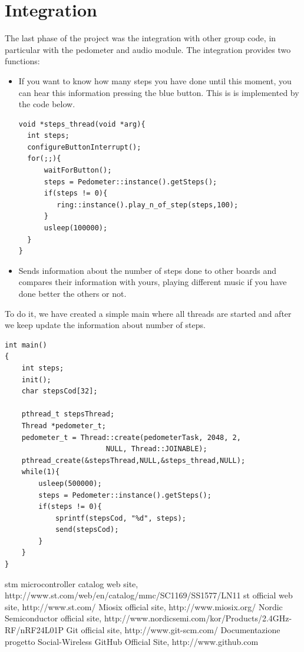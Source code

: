 \documentclass[11pt,a4paper,oneside]{article}
\begin{document}
\section{Integration}
The last phase of the project was the integration with other group code, in particular with the pedometer and audio module.
The integration provides two functions:
\begin{itemize}
\item If you want to know how many steps you have done until this moment, you can hear this information pressing the blue button. This is is implemented by the code below.
\lstset{numbers=left,numberstyle=\tiny}
\begin{lstlisting}[frame=single]
void *steps_thread(void *arg){
  int steps;
  configureButtonInterrupt();
  for(;;){
      waitForButton();
      steps = Pedometer::instance().getSteps();
      if(steps != 0){
         ring::instance().play_n_of_step(steps,100);
      }
      usleep(100000);      
  }
}
\end{lstlisting}
\item Sends information about the number of steps done to other boards and compares their information with yours, playing different music if you have done better the others or not.
\end{itemize} 
To do it, we have created a simple main where all threads are started and after we keep update the information about number of steps.
\lstset{numbers=left,numberstyle=\tiny}
\begin{lstlisting}[frame=single]
int main()
{
    int steps;
    init();
    char stepsCod[32];
		
    pthread_t stepsThread;
    Thread *pedometer_t;
    pedometer_t = Thread::create(pedometerTask, 2048, 2, 
                        NULL, Thread::JOINABLE);
    pthread_create(&stepsThread,NULL,&steps_thread,NULL);
    while(1){
        usleep(500000);
        steps = Pedometer::instance().getSteps();
        if(steps != 0){
            sprintf(stepsCod, "%d", steps);
            send(stepsCod);
        }
    }
}
\end{lstlisting}

\newpage
\begin{thebibliography}{99}

	 stm microcontroller catalog web site,\\http://www.st.com/web/en/catalog/mmc/SC1169/SS1577/LN11
	 st official web site, http://www.st.com/
	 Miosix official site, http://www.miosix.org/
	 Nordic Semiconductor official site, http://www.nordicsemi.com/kor/Products/2.4GHz-RF/nRF24L01P
	 Git official site, http://www.git-scm.com/
	 Documentazione progetto Social-Wireless
	 GitHub Official Site, http://www.github.com
\end{thebibliography}
 
\end{document}
